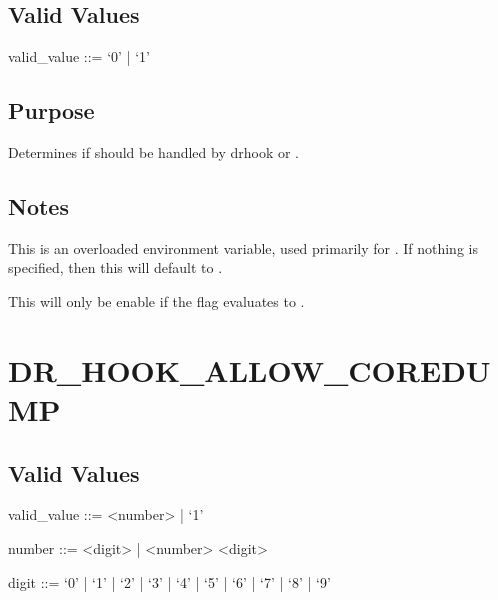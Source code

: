 \documentclass[letterpaper,10pt,english]{sphinxmanual}
\begin{document}
\subsection{Valid Values}
\label{\detokenize{flag/flag:id55}}
\begin{DUlineblock}{0em}
\item[] valid\_value ::= ‘0’ | ‘1’
\end{DUlineblock}


\subsection{Purpose}
\label{\detokenize{flag/flag:id56}}
\sphinxAtStartPar
Determines if  should be handled by drhook or .


\subsection{Notes}
\label{\detokenize{flag/flag:id57}}
\sphinxAtStartPar
This is an overloaded environment variable, used primarily for . If nothing is specified, then this will default to .

\sphinxAtStartPar
This will only be enable if the {\hyperref[\detokenize{flag/flag:atp-enabled}]{}} flag evaluates to .


\section{DR\_HOOK\_ALLOW\_COREDUMP}
\label{\detokenize{flag/flag:dr-hook-allow-coredump}}\label{\detokenize{flag/flag:id59}}

\subsection{Valid Values}
\label{\detokenize{flag/flag:id60}}
\begin{DUlineblock}{0em}
\item[] valid\_value ::= \textless{}number\textgreater{} | ‘\sphinxhyphen{}1’
\item[] number ::= \textless{}digit\textgreater{} | \textless{}number\textgreater{} \textless{}digit\textgreater{}
\item[] digit ::= ‘0’ | ‘1’ | ‘2’ | ‘3’ | ‘4’ | ‘5’ | ‘6’ | ‘7’ | ‘8’ | ‘9’
\end{DUlineblock}
\end{document}
